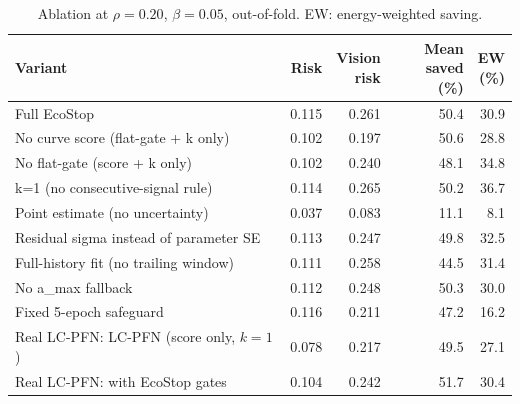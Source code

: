 \documentclass[3p,twocolumn,10pt]{elsarticle}
\theoremstyle{definition}
\begin{document}
\begin{table}[t]
\centering
\caption{Ablation at $\rho=0.20$, $\beta=0.05$, out-of-fold. EW: energy-weighted saving.}
\label{tab:ablation}
\footnotesize
\begin{adjustbox}{max width=\columnwidth}
\begin{tabular}{p{4.6cm}rrrr}
\toprule
Variant & Risk & \shortstack{Vision\\risk} & \shortstack{Mean\\saved (\%)} & \shortstack{EW\\(\%)} \\
\midrule
Full EcoStop & 0.115 & 0.261 & 50.4 & 30.9 \\
No curve score (flat-gate + k only) & 0.102 & 0.197 & 50.6 & 28.8 \\
No flat-gate (score + k only) & 0.102 & 0.240 & 48.1 & 34.8 \\
k=1 (no consecutive-signal rule) & 0.114 & 0.265 & 50.2 & 36.7 \\
Point estimate (no uncertainty) & 0.037 & 0.083 & 11.1 & 8.1 \\
Residual sigma instead of parameter SE & 0.113 & 0.247 & 49.8 & 32.5 \\
Full-history fit (no trailing window) & 0.111 & 0.258 & 44.5 & 31.4 \\
No a_max fallback & 0.112 & 0.248 & 50.3 & 30.0 \\
Fixed 5-epoch safeguard & 0.116 & 0.211 & 47.2 & 16.2 \\
Real LC-PFN: LC-PFN (score only, $k{=}1$) & 0.078 & 0.217 & 49.5 & 27.1 \\
Real LC-PFN: with EcoStop gates & 0.104 & 0.242 & 51.7 & 30.4 \\
\bottomrule
\end{tabular}
\end{adjustbox}
\end{table}
\end{document}
